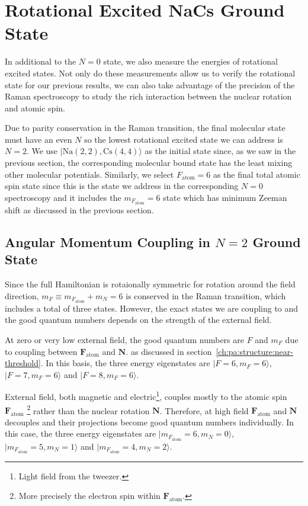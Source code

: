 \section{Rotational Excited NaCs Ground State}
\label{ch:raman-spectroscopy:n2}

In additional to the $N=0$ state, we also measure the energies of rotational excited states.
Not only do these measurements allow us to verify the rotational state for our previous results,
we can also take advantage of the precision of the Raman spectroscopy
to study the rich interaction between the nuclear rotation and atomic spin.

Due to parity conservation in the Raman transition,
the final molecular state must have an even $N$
so the lowest rotational excited state we can address is $N=2$.
We use $|\mathrm{Na(2, 2),Cs(4, 4)}\rangle$ as the initial state since,
as we saw in the previous section, the corresponding molecular bound state
has the least mixing other molecular potentials.
Similarly, we select $F_{\mathrm{atom}}=6$ as the final total atomic spin state
since this is the state we address in the corresponding $N=0$ spectroscopy and
it includes the $m_{F_{\mathrm{atom}}}=6$ state which has minimum
Zeeman shift as discussed in the previous section.

\subsection{Angular Momentum Coupling in $N=2$ Ground State}
\label{ch:raman-spectroscopy:n2:angular-momentum}

Since the full Hamiltonian is rotaionally symmetric for rotation around the field direction,
$m_F\equiv m_{F_{\mathrm{atom}}}+m_{N}=6$ is conserved in the Raman transition,
which includes a total of three states.
However, the exact states we are coupling to and the good quantum numbers depends on
the strength of the external field.

At zero or very low external field, the good quantum numbers are $F$ and $m_F$
due to coupling between $\mathbf{F}_{\mathrm{atom}}$ and $\mathbf{N}$.
as discussed in section~\ref{ch:pa:structure:near-threshold}.
In this basis, the three energy eigenstates are
$|F=6,m_F=6\rangle$, $|F=7,m_F=6\rangle$ and $|F=8,m_F=6\rangle$.

External field, both magnetic and electric\footnote{Light field from the tweezer.},
couples mostly to the atomic spin $\mathbf{F}_{\mathrm{atom}}$
\footnote{More precisely the electron spin within $\mathbf{F}_{\mathrm{atom}}$.}
rather than the nuclear rotation $\mathbf{N}$.
Therefore, at high field $\mathbf{F}_{\mathrm{atom}}$ and $\mathbf{N}$
decouples and their projections become good quantum numbers individually.
In this case, the three energy eigenstates are
$|m_{F_\mathrm{atom}}=6,m_N=0\rangle$, $|m_{F_\mathrm{atom}}=5,m_N=1\rangle$ and
$|m_{F_\mathrm{atom}}=4,m_N=2\rangle$.

